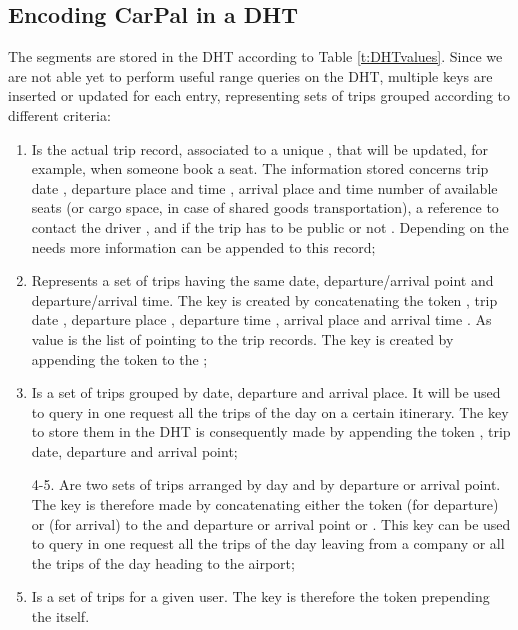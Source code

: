 \subsection{Encoding CarPal in a DHT }
%
The segments are stored in the DHT according to Table
\ref{t:DHTvalues}.
%
Since we are not able yet to perform useful range queries on the DHT,
multiple keys are inserted or updated for each entry, representing
sets of trips grouped according to different criteria:
%
\begin{enumerate}
\item Is the actual trip record, associated to a unique
  , that will be updated, for example, when someone book
  a seat.  The information stored concerns trip date ,
  departure place  and time , arrival place
   and time  number of available seats 
  (or cargo space, in case of shared goods transportation), a
  reference to contact the driver , and if the trip has to
  be public or not .  Depending on the needs more information
  can be appended to this record;
\item Represents a set of trips having the same date,
  departure/arrival point and departure/arrival time. The key is
  created by concatenating the token , trip date ,
  departure place , departure time , arrival place
   and arrival time .  As value is the list of
   pointing to the trip records. The key is created by
  appending the token  to the ;
\item Is a set of trips grouped by date, departure and arrival place.
  It will be used to query in one request all the trips of the day on
  a certain itinerary. The key to store them in the DHT is
  consequently made by appending the token , trip date,
  departure and arrival point;
\item[4-5.] Are two sets of trips arranged by day and by departure
  or arrival point. The key is therefore made by concatenating either
  the token  (for departure) or  (for arrival) to the
   and departure or arrival point  or .
  This key can be used \eg to query in one request all the trips of
  the day leaving from a company or all the trips of the day heading
  to the airport; \setcounter{enumi}{5}
\item Is a set of trips for a given user. The key is therefore the
  token  prepending the  itself.
\end{enumerate}

